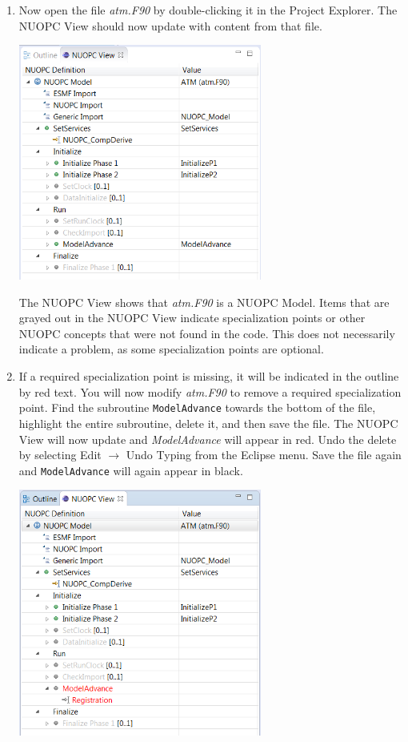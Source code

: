 \documentclass[oneside,11pt]{memoir}
\begin{document}
\begin{enumerate}

\item Now open the file \emph{atm.F90} by double-clicking it in the Project Explorer.  The NUOPC View should now update with content from that file.

\vspace{24pt}
\parbox{\linewidth}{\centering
  \includegraphics[width=8cm]{figs/reveng_fig7.png}
}
\vspace{24pt}

The NUOPC View shows that \emph{atm.F90} is a NUOPC Model.  Items that are grayed out in the NUOPC View indicate specialization points or other NUOPC concepts that were not found in the code.  This does not necessarily indicate a problem, as some specialization points are optional.  

\item If a required specialization point is missing, it will be indicated in the outline by red text.  You will now modify \emph{atm.F90} to remove a required specialization point.  Find the subroutine \texttt{ModelAdvance} towards the bottom of the file, highlight the entire subroutine, delete it, and then save the file.  The NUOPC View will now update and \emph{ModelAdvance} will appear in red.  Undo the delete by selecting Edit $\rightarrow$ Undo Typing from the Eclipse menu. Save the file again and \texttt{ModelAdvance} will again appear in black.

\vspace{24pt}
\parbox{\linewidth}{\centering
  \includegraphics[width=8cm]{figs/reveng_fig8.png}
}
\vspace{24pt}




\end{enumerate}
\end{document}
